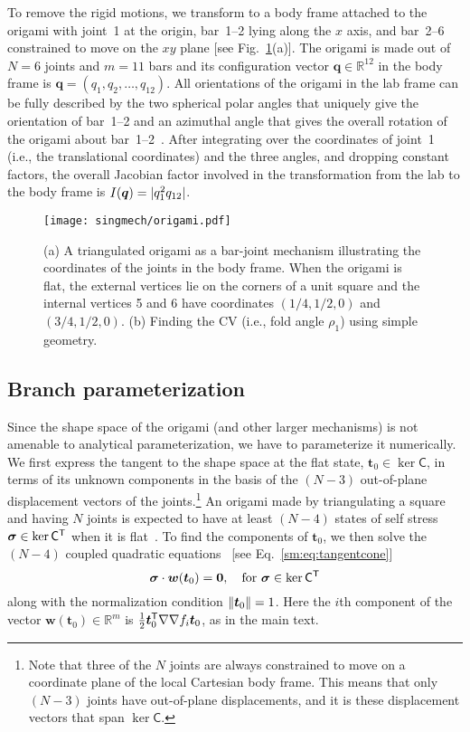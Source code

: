 To remove the rigid motions, we transform to a body frame attached to the origami with joint~1 at the origin, bar~1--2 lying along the $x$ axis, and bar~2--6 constrained to move on the $xy$ plane [see Fig.~\ref{sm:fig:origami}(a)].
The origami is made out of $N = 6$ joints and $m = 11$ bars and its configuration vector $\bm{q} \in \mathbb{R}^{12}$ in the body frame is $\bm{q} = (q_{1}, q_{2}, \ldots, q_{12})$.
All orientations of the origami in the lab frame can be fully described by the two spherical polar angles that uniquely give the orientation of bar~1--2 and an azimuthal angle that gives the overall rotation of the origami about bar~1--2~\cite{herschbach1959}.
After integrating over the coordinates of joint~1 (i.e., the translational coordinates) and the three angles, and dropping constant factors, the overall Jacobian factor involved in the transformation from the lab to the body frame is $I(\bm{q}) = \lvert q_1^2 q_{12}\rvert$.
%
\begin{figure}
  \begin{center}
    \texttt{[image: singmech/origami.pdf]}
  \end{center}
  \caption{(a) A triangulated origami as a bar-joint mechanism illustrating the coordinates of the joints in the body frame. When the origami is flat, the external vertices lie on the corners of a unit square and the internal vertices 5 and 6 have coordinates $(1/4,1/2,0)$ and $(3/4,1/2,0)$. (b) Finding the CV (i.e., fold angle $\rho_{1}$) using simple geometry.}
  \label{sm:fig:origami}
\end{figure}

\subsection{Branch parameterization}

Since the shape space of the origami (and other larger mechanisms) is not amenable to analytical parameterization, we have to parameterize it numerically.
We first express the tangent to the shape space at the flat state, $\bm{t}_{0} \in \ker \mathsf{C}$, in terms of its unknown components in the basis of the $(N - 3)$ out-of-plane displacement vectors of the joints.\footnote{Note that three of the $N$ joints are always constrained to move on a coordinate plane of the local Cartesian body frame.  This means that only $(N - 3)$ joints have out-of-plane displacements, and it is these displacement vectors that span $\ker\mathsf{C}$.}
An origami made by triangulating a square and having $N$ joints is expected to have at least $(N - 4)$ states of self stress $\bm{\sigma} \in \ker\mathsf{C}^\mathsf{T}$ when it is flat~\cite{chen2018}.
To find the components of $\bm{t}_{0}$, we then solve the $(N - 4)$ coupled quadratic equations~\cite{tarnai2001,chen2018} [see Eq.~\eqref{sm:eq:tangentcone}]
%
\begin{equation}
  \bm{\sigma}\cdot\bm{w}(\bm{t}_{0}) = \bm{0},\quad \text{for } \bm{\sigma} \in \ker{\mathsf{C}\ensuremath{^\mathsf{T}}}
  \label{sm:eq:quadratic}
\end{equation}
%
along with the normalization condition $\lVert\bm{t}_{0}\rVert = 1$.
Here the $i$th component of the vector $\bm{w}(\bm{t}_{0}) \in \mathbb{R}^{m}$ is $\frac{1}{2}\bm{t}_{0}^\mathsf{T} \nabla\nabla f_{i} \bm{t}_{0}$, as in the main text.

